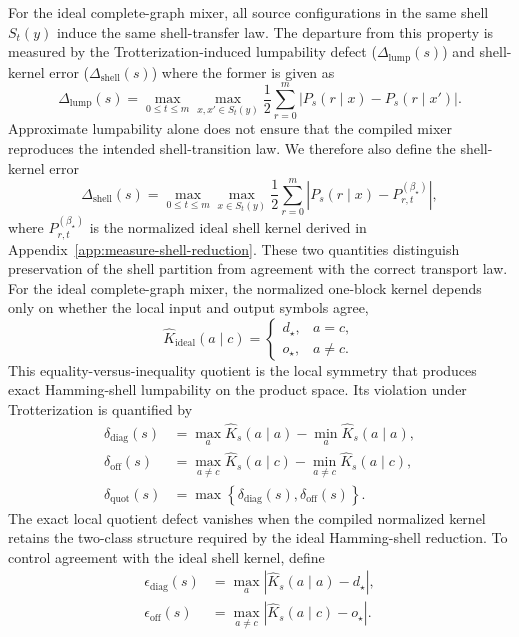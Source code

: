 \documentclass[a4paper,onecolumn,11pt,unpublished]{quantumarticle}
\theoremstyle{remark}
\begin{document}
For the ideal complete-graph mixer, all source configurations in the same
shell \(S_t(y)\) induce the same shell-transfer law. The departure from this
property is measured by the Trotterization-induced lumpability defect ($\Delta_{\mathrm{lump}}(s)$) and shell-kernel error ($\Delta_{\mathrm{shell}} (s)$) where the former is given as 
\begin{equation}
\Delta_{\mathrm{lump}}(s)
=
\max_{0\leq t\leq m}
\max_{x,x'\in S_t(y)}
\frac{1}{2}
\sum_{r=0}^{m}
\left|
P_s(r\mid x)
-
P_s(r\mid x')
\right|.
\label{eq:trotter-lumpability-defect}
\end{equation}
Approximate lumpability alone does not ensure that the compiled mixer
reproduces the intended shell-transition law. We therefore also define the
shell-kernel error
\begin{equation}
\Delta_{\mathrm{shell}}(s)
=
\max_{0\leq t\leq m}
\max_{x\in S_t(y)}
\frac{1}{2}
\sum_{r=0}^{m}
\left|
P_s(r\mid x)
-
P_{r,t}^{(\beta_\star)}
\right|,
\label{eq:trotter-shell-error}
\end{equation}
where \(P_{r,t}^{(\beta_\star)}\) is the normalized ideal shell kernel derived
in Appendix~\ref{app:measure-shell-reduction}. These two quantities
distinguish preservation of the shell partition from agreement with the correct transport law. For the ideal complete-graph mixer, the normalized one-block kernel depends
only on whether the local input and output symbols agree,
\begin{equation}
\widehat K_{\mathrm{ideal}}(a\mid c)
=
\begin{cases}
d_\star, & a=c,\\
o_\star, & a\neq c.
\end{cases}
\label{eq:ideal-local-two-class-kernel}
\end{equation}
This equality-versus-inequality quotient is the local symmetry that produces
exact Hamming-shell lumpability on the product space. Its violation under
Trotterization is quantified by
\begin{align}
\delta_{\mathrm{diag}}(s)
&=
\max_a \widehat K_s(a\mid a)
-
\min_a \widehat K_s(a\mid a),
\\
\delta_{\mathrm{off}}(s)
&=
\max_{a\neq c}\widehat K_s(a\mid c)
-
\min_{a\neq c}\widehat K_s(a\mid c),
\\
\delta_{\mathrm{quot}}(s)
&=
\max\!\left\{
\delta_{\mathrm{diag}}(s),
\delta_{\mathrm{off}}(s)
\right\}.
\label{eq:local-quotient-defect}
\end{align}
The exact local quotient defect vanishes when the compiled normalized kernel retains the two-class structure required by the ideal Hamming-shell reduction. To control agreement with the ideal shell kernel, define
\begin{align}
\epsilon_{\mathrm{diag}}(s)
&=
\max_a
\left|
\widehat K_s(a\mid a)-d_\star
\right|,
\\
\epsilon_{\mathrm{off}}(s)
&=
\max_{a\neq c}
\left|
\widehat K_s(a\mid c)-o_\star
\right|.
\end{align}
\end{document}
